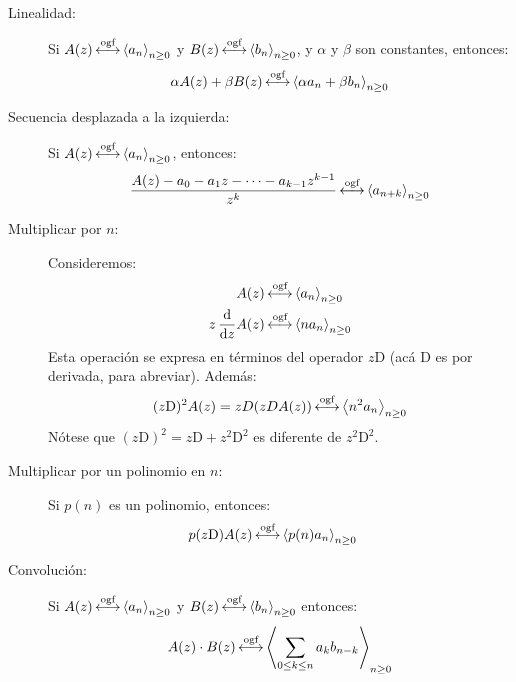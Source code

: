   \begin{description}
  \item[Linealidad:]
    Si \(A(z) \operatorname{\stackrel{\text{ogf}}{\longleftrightarrow}} \left\langle a_n \right\rangle_{n \ge 0}\)
    y \(B(z) \operatorname{\stackrel{\text{ogf}}{\longleftrightarrow}} \left\langle b_n \right\rangle_{n \ge 0}\),
    y \(\alpha\) y \(\beta\) son constantes,
    entonces:
    \begin{equation*}
      \alpha A(z) + \beta B(z)
	 \operatorname{\stackrel{\text{ogf}}{\longleftrightarrow}} \left\langle
		\alpha a_n + \beta b_n
	      \right\rangle_{n \ge 0}
    \end{equation*}
  \item[Secuencia desplazada a la izquierda:]
    Si
    \(A(z) \operatorname{\stackrel{\text{ogf}}{\longleftrightarrow}} \left\langle a_n \right\rangle_{n \ge 0}\),
    entonces:
    \begin{equation*}
      \frac{A(z) - a_0 - a_1 z - \dotsb - a_{k - 1} z^{k - 1}}{z^k}
	\operatorname{\stackrel{\text{ogf}}{\longleftrightarrow}} \left\langle a_{n + k}\right\rangle_{n \ge 0}
    \end{equation*}
  \item[Multiplicar por \(n\):]
    Consideremos:
    \begin{align*}
      A(z)
	&\operatorname{\stackrel{\text{ogf}}{\longleftrightarrow}} \left\langle a_n\right\rangle_{n \ge 0} \\
      z \, \frac{\mathrm{d}}{\mathrm{d} z} A(z)
	&\operatorname{\stackrel{\text{ogf}}{\longleftrightarrow}} \left\langle n a_n\right\rangle_{n \ge 0}
    \end{align*}
    Esta operación
    se expresa en términos del operador \(z \mathrm{D}\)
    (acá \(\mathrm{D}\) es por derivada,
     para abreviar).
    Además:
    \begin{equation*}
      (z \mathrm{D})^2 A(z)
	= z D (z D A(z))
	\operatorname{\stackrel{\text{ogf}}{\longleftrightarrow}} \left\langle n^2 a_n\right\rangle_{n \ge 0}
    \end{equation*}
    Nótese que
      \((z \mathrm{D})^2 = z \mathrm{D} + z^2 \mathrm{D}^2\)
    es diferente de \(z^2 \mathrm{D}^2\).
  \item[Multiplicar por un polinomio en \(n\):]
    Si \(p(n)\) es un polinomio,
    entonces:
    \begin{align*}
      p(z \mathrm{D}) A(z)
	&\operatorname{\stackrel{\text{ogf}}{\longleftrightarrow}} \left\langle p(n) a_n \right\rangle_{n \ge 0}
    \end{align*}
  \item[Convolución:]
    Si \(A(z) \operatorname{\stackrel{\text{ogf}}{\longleftrightarrow}} \left\langle a_n \right\rangle_{n \ge 0}\)
    y \(B(z) \operatorname{\stackrel{\text{ogf}}{\longleftrightarrow}} \left\langle b_n \right\rangle_{n \ge 0}\)
    entonces:
    \begin{equation*}
      A(z) \cdot B(z)
	\operatorname{\stackrel{\text{ogf}}{\longleftrightarrow}} \left\langle
	       \sum_{0 \le k \le n} a_k b_{n - k}
	      \right\rangle_{n \ge 0}
    \end{equation*}

\end{description}
